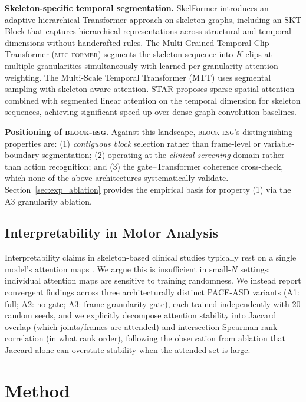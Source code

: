 \documentclass[a4paper,fleqn]{cas-sc}
\newcommand{\besg}{\textsc{block-esg}\xspace}
\newcommand{\mtcf}{\textsc{mtc-former}\xspace}
\begin{document}
\textbf{Skeleton-specific temporal segmentation.}
SkelFormer \citep{yan2026skelformer} introduces an adaptive hierarchical
Transformer approach on skeleton graphs, including an SKT Block that captures
hierarchical representations across structural and temporal dimensions without
handcrafted rules.
The Multi-Grained Temporal Clip Transformer (\mtcf) \citep{zhu2025mtcformer}
segments the skeleton sequence into $K$ clips at multiple granularities
simultaneously with learned per-granularity attention weighting.
The Multi-Scale Temporal Transformer (MTT) \citep{kong2022mtt} uses segmental
sampling with skeleton-aware attention.
STAR \citep{shi2021star} proposes sparse spatial attention combined with
segmented linear attention on the temporal dimension for skeleton sequences,
achieving significant speed-up over dense graph convolution baselines.

\textbf{Positioning of \besg.}
Against this landscape, \besg's distinguishing properties are:
(1) \textit{contiguous block} selection rather than frame-level or
variable-boundary segmentation;
(2) operating at the \textit{clinical screening} domain rather than action
recognition; and
(3) the gate--Transformer coherence cross-check, which none of the above
architectures systematically validate.
Section~\ref{sec:exp_ablation} provides the empirical basis for property (1)
via the A3 granularity ablation.


\subsection{Interpretability in Motor Analysis}

Interpretability claims in skeleton-based clinical studies typically rest on
a single model's attention maps \citep{pediaditis2022video}.
We argue this is insufficient in small-$N$ settings: individual attention maps
are sensitive to training randomness.
We instead report convergent findings across three architecturally distinct
PACE-ASD variants (A1: full; A2: no gate; A3: frame-granularity gate), each
trained independently with 20 random seeds, and we explicitly decompose
attention stability into Jaccard overlap (which joints/frames are attended)
and intersection-Spearman rank correlation (in what rank order), following the
observation from ablation that Jaccard alone can overstate stability when
the attended set is large.

\section{Method}
\label{sec:method}
\end{document}
